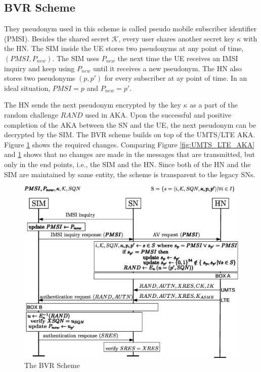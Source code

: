 \documentclass{llncs} %
\begin{document}
\subsection{BVR Scheme}
They pseudonym used in this scheme is called pseudo mobile subscriber identifier (PMSI). Besides the shared secret $\mathcal{K}$, every user shares another secret key $\kappa$ with the HN. The SIM inside the UE stores two pseudonyms at any point of time, $\left(PMSI,P_{new}\right)$. The SIM uses $P_{new}$ the next time the UE receives an IMSI inquiry and keep using $P_{new}$ until it receives a new pseudonym. The HN also stores two pseudonyms $\left(p,p'\right)$ for every subscriber at ay point of time. In an ideal situation, $PMSI = p$ and $P_{new} = p'$. 

The HN sends the next pseudonym encrypted by the key $\kappa$ as a part of the random challenge $RAND$ used in AKA. Upon the successful and positive completion of the AKA between the SN and the UE, the next pseudonym can be decrypted by the SIM. The BVR scheme builds on top of the UMTS/LTE AKA. Figure \ref{fig:bvr_solution} shows the required changes. Comparing Figure \ref{fig:UMTS_LTE_AKA} and \ref{fig:bvr_solution} shows that no changes are made in the messages that are transmitted, but only in the end points, i.e., the SIM and the HN. Since both of the HN and the SIM are maintained by same entity, the scheme is transparent to the legacy SNs.


\begin{figure}[]
  \centering
    \includegraphics[width=.9\textwidth]{BVR.eps}
  \caption{The BVR Scheme}
  \label{fig:bvr_solution}	
\end{figure}
\end{document}
